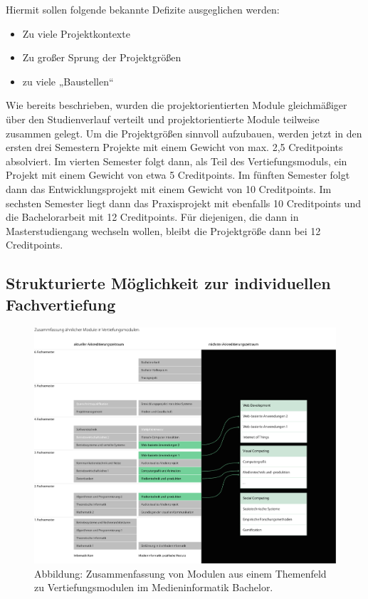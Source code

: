 Hiermit sollen folgende bekannte Defizite ausgeglichen werden:

\begin{itemize}
\tightlist
\item
  Zu viele Projektkontexte
\item
  Zu großer Sprung der Projektgrößen
\item
  zu viele „Baustellen``
\end{itemize}

Wie bereits beschrieben, wurden die projektorientierten Module
gleichmäßiger über den Studienverlauf verteilt und projektorientierte
Module teilweise zusammen gelegt. Um die Projektgrößen sinnvoll
aufzubauen, werden jetzt in den ersten drei Semestern Projekte mit einem
Gewicht von max. 2,5 Creditpoints absolviert. Im vierten Semester folgt
dann, als Teil des Vertiefungsmoduls, ein Projekt mit einem Gewicht von
etwa 5 Creditpoints. Im fünften Semester folgt dann das
Entwicklungsprojekt mit einem Gewicht von 10 Creditpoints. Im sechsten
Semester liegt dann das Praxisprojekt mit ebenfalls 10 Creditpoints und
die Bachelorarbeit mit 12 Creditpoints. Für diejenigen, die dann in
Masterstudiengang wechseln wollen, bleibt die Projektgröße dann bei 12
Creditpoints.

\subsection{Strukturierte Möglichkeit zur individuellen
Fachvertiefung}\label{strukturierte-muxf6glichkeit-zur-individuellen-fachvertiefung}

\begin{figure}[htbp][htbp]
\centering
\includegraphics[width=\columnwidth]{../anhaenge/bilder/ba-vertiefungen.pdf}
\caption{Abbildung: Zusammenfassung von Modulen aus einem Themenfeld zu
Vertiefungsmodulen im Medieninformatik Bachelor.}
\end{figure}

